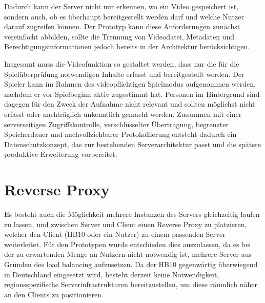 Dadurch kann der Server nicht nur erkennen, wo ein Video gespeichert ist, 
sondern auch, ob es überhaupt bereitgestellt werden darf und welche Nutzer darauf zugreifen können. Der Prototyp kann diese Anforderungen zunächst vereinfacht abbilden, sollte die Trennung von Videodatei, Metadaten und Berechtigungsinformationen jedoch bereits in der Architektur berücksichtigen. 

Insgesamt muss die Videofunktion so gestaltet werden, dass nur die für die Spielüberprüfung notwendigen Inhalte erfasst und bereitgestellt werden. Der Spieler kann im Rahmen des videopflichtigen Spielmodus aufgenommen werden, nachdem er vor Spielbeginn aktiv zugestimmt hat. 
Personen im Hintergrund sind dagegen für den Zweck der Aufnahme nicht relevant und sollten möglichst nicht erfasst oder nachträglich unkenntlich gemacht werden. Zusammen mit einer serverseitigen Zugriffskontrolle, verschlüsselter Übertragung, 
begrenzter Speicherdauer und nachvollziehbarer Protokollierung entsteht dadurch ein Datenschutzkonzept, das zur bestehenden Serverarchitektur passt und die spätere produktive Erweiterung vorbereitet.

\section{Reverse Proxy}

Es besteht auch die Möglichkeit mehrere Instanzen des Servers gleichzeitig laufen zu lassen, und zwischen Server und Client einen Reverse Proxy\cite{nginx_reverse_proxy} zu platzieren, welcher den Client (HB10 oder ein Nutzer) zu einem passenden Server weiterleitet. Für den Prototypen wurde entschieden dies auszulassen,
da es bei der zu erwartenden Menge an Nutzern nicht notwendig ist, mehrere Server aus Gründen des load balancing aufzusetzen. Da der HB10 gegenwärtig überwiegend in Deutschland eingesetzt wird, besteht derzeit keine Notwendigkeit, regionsspezifische Serverinfrastrukturen bereitzustellen, 
um diese räumlich näher an den Clients zu positionieren.

\newpage
